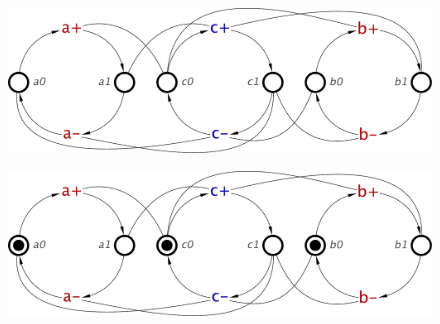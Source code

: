 \documentclass[british, journal]{IEEEtran}
\begin{document}
\begin{figure}[H]
	\vspace{-1mm}
	\begin{centering}
		\includegraphics[scale=0.3]{Images/Step-by-step9}
		\par
		\vspace{-1mm}
		\par\end{centering}
	\vspace{-2mm}
\end{figure}

\begin{figure}[H]
	\vspace{-2mm}
	\begin{centering}
		\includegraphics[scale=0.3]{Images/Step-by-step12}
		\par
		\vspace{-1mm}
		\par\end{centering}
	\vspace{-1mm}
\end{figure}
\end{document}
